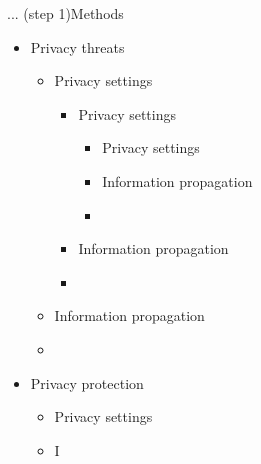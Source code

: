 \begin{frame}{... (step 1)}{Methods}
	\begin{itemize}
		\item Privacy threats
			\begin{itemize}
				\item Privacy settings
							\begin{itemize}
				\item Privacy settings
							\begin{itemize}
				\item Privacy settings
				\item Information propagation
				\item 
			\end{itemize}
				\item Information propagation
				\item 
			\end{itemize}
				\item Information propagation
				\item 
			\end{itemize}
		\item Privacy protection
			\begin{itemize}
				\item Privacy settings
				\item I
			\end{itemize}
	\end{itemize}
	

\end{frame}
